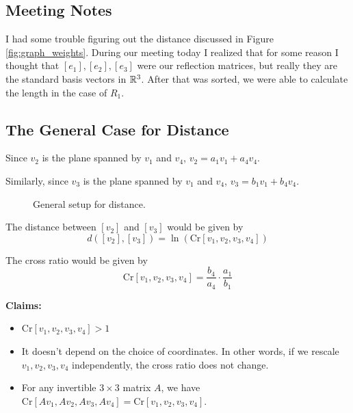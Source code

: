 \documentclass{amsart}
\begin{document}
\subsection{Meeting Notes}
I had some trouble figuring out the distance discussed in Figure \ref{fig:graph_weights}. During our meeting today I realized that for some reason I thought that $[e_1], [e_2], [e_3]$ were our reflection matrices, but really they are the standard basis vectors in $\mathbb{R}^3$. After that was sorted, we were able to calculate the length in the case of $R_1$.

\subsection*{The General Case for Distance}

Since $v_2$ is the plane spanned by $v_1$ and $v_4$, $v_2 = a_1 v_1 + a_4 v_4$.

Similarly, since $v_3$ is the plane spanned by $v_1$ and $v_4$, $v_3 = b_1 v_1 + b_4 v_4$.

\begin{figure}[h]
	\caption{General setup for distance.}
	\label{fig:general_distance_setup}
\end{figure}

The distance between $[v_2]$ and $[v_3]$ would be given by
\begin{equation*}
	d([v_2], [v_3]) = \ln \left( \text{Cr}\left[ v_1, v_2, v_3, v_4\right] \right)
\end{equation*}

The cross ratio would be given by
\begin{equation*}
	\text{Cr}\left[ v_1, v_2, v_3, v_4 \right] = \frac{b_4}{a_4} \cdot \frac{a_1}{b_1}
\end{equation*}

\textbf{Claims:}
\begin{itemize}
	\item $\text{Cr}\left[ v_1, v_2, v_3, v_4 \right] > 1$
	\item It doesn't depend on the choice of coordinates. In other words, if we rescale $v_1, v_2, v_3, v_4$ independently, the cross ratio does not change.
	\item For any invertible $3\times3$ matrix $A$, we have $\text{Cr}\left[ Av_1, Av_2, Av_3, Av_4 \right] = \text{Cr}\left[ v_1, v_2, v_3, v_4 \right].$
\end{itemize}
\end{document}
